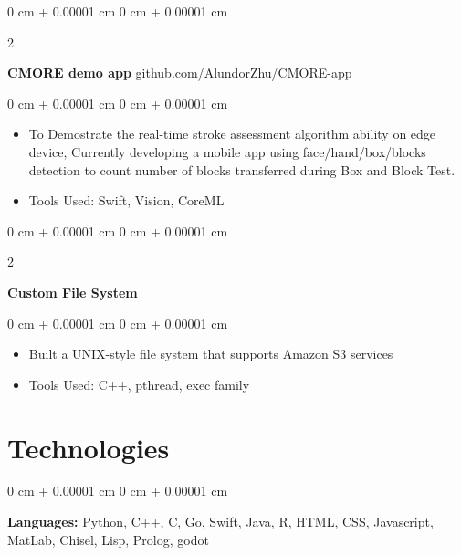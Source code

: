 \documentclass[10pt, letterpaper]{article}
\newenvironment{highlights}{
    \begin{itemize}[
        topsep=0.10 cm,
        parsep=0.10 cm,
        partopsep=0pt,
        itemsep=0pt,
        leftmargin=0 cm + 10pt
    ]
}{
    \end{itemize}
} %
\newenvironment{onecolentry}{
    \begin{adjustwidth}{
        0 cm + 0.00001 cm
    }{
        0 cm + 0.00001 cm
    }
}{
    \end{adjustwidth}
} %
\newenvironment{twocolentry}[2][]{
    \onecolentry
    \def\secondColumn{#2}
    \setcolumnwidth{\fill, 6 cm}
    \begin{paracol}{2}
}{
    \switchcolumn \raggedleft \secondColumn
    \end{paracol}
    \endonecolentry
} %
\begin{document}
        \vspace{0.2 cm}

        \begin{twocolentry}{
            \href{https://github.com/AlundorZhu/CMORE-app}{github.com/AlundorZhu/CMORE-app}
        }
            \textbf{CMORE demo app}\end{twocolentry}

        \vspace{0.10 cm}
        \begin{onecolentry}
            \begin{highlights}
                \item To Demostrate the real-time stroke assessment algorithm ability on edge device, Currently developing a mobile app using face/hand/box/blocks detection to count number of blocks transferred during Box and Block Test. 
                \item Tools Used: Swift, Vision, CoreML
            \end{highlights}
        \end{onecolentry}


        \vspace{0.2 cm}

        \begin{twocolentry}{
            2023
        }
            \textbf{Custom File System}\end{twocolentry}

        \vspace{0.10 cm}
        \begin{onecolentry}
            \begin{highlights}
                \item Built a UNIX-style file system that supports Amazon S3 services
                \item Tools Used: C++, pthread, exec family
            \end{highlights}
        \end{onecolentry}



    
    \section{Technologies}



        
        \begin{onecolentry}
            \textbf{Languages:} Python, C++, C, Go, Swift, Java, R, HTML, CSS, Javascript, MatLab, Chisel, Lisp, Prolog, godot %
        \end{onecolentry}
\end{document}
